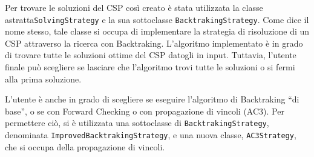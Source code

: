 Per trovare le soluzioni del CSP così creato è stata utilizzata la classe astratta\texttt{SolvingStrategy} e la sua sottoclasse \texttt{BacktrakingStrategy}. Come dice il nome stesso, tale classe si occupa di implementare la strategia di risoluzione di un CSP attraverso la ricerca con Backtraking. L'algoritmo implementato è in grado di trovare tutte le soluzioni ottime del CSP datogli in input. Tuttavia, l'utente finale può scegliere se lasciare che l'algoritmo trovi tutte le soluzioni o si fermi alla prima soluzione.

L'utente è anche in grado di scegliere se eseguire l'algoritmo di Backtraking ``di base'', o se con Forward Checking o con propagazione di vincoli (AC3). Per permettere ciò, si è utilizzata una sottoclasse di \texttt{BacktrakingStrategy}, denominata \texttt{ImprovedBacktrakingStrategy}, e una nuova classe, \texttt{AC3Strategy}, che si occupa della propagazione di vincoli.


